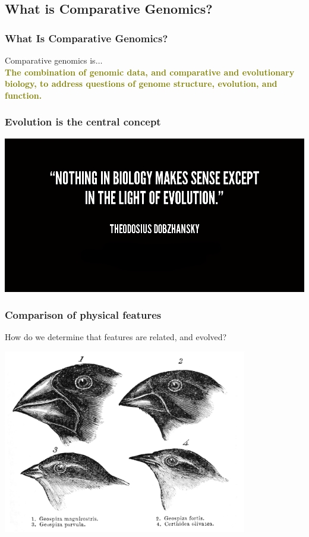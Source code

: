 
\subsection{What is Comparative Genomics?}



%
\begin{frame}
  \frametitle{What Is Comparative Genomics?}
  Comparative genomics is$\ldots$ \\
  \Large{
    \textcolor{olive}{
      \textbf{
      The combination of genomic data, and comparative and evolutionary biology, to address questions of   genome structure, evolution, and function.
      }
    }
  }
\end{frame}

%
\begin{frame}
  \frametitle{Evolution is the central concept}
  \begin{center}
    \includegraphics[width=\textwidth]{images/dobzhansky_quote}
  \end{center}  
\end{frame}

%
\begin{frame}
  \frametitle{Comparison of physical features}
  How do we determine that features are related, and evolved? \\
  \begin{center}
    \includegraphics[width=0.8\textwidth]{images/darwin_finches}
  \end{center}  
\end{frame}

